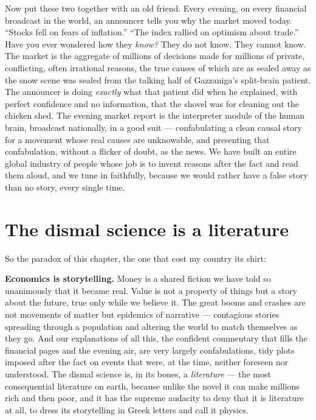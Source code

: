 Now put these two together with an old friend. Every evening, on every financial broadcast in the world, an announcer tells you why the market moved today. ``Stocks fell on fears of inflation.'' ``The index rallied on optimism about trade.'' Have you ever wondered how they \emph{know?} They do not know. They cannot know. The market is the aggregate of millions of decisions made for millions of private, conflicting, often irrational reasons, the true causes of which are as sealed away as the snow scene was sealed from the talking half of Gazzaniga's split-brain patient. The announcer is doing \emph{exactly} what that patient did when he explained, with perfect confidence and no information, that the shovel was for cleaning out the chicken shed. The evening market report is the interpreter module of the human brain, broadcast nationally, in a good suit — confabulating a clean causal story for a movement whose real causes are unknowable, and presenting that confabulation, without a flicker of doubt, as the news. We have built an entire global industry of people whose job is to invent reasons after the fact and read them aloud, and we tune in faithfully, because we would rather have a false story than no story, every single time.

\section*{The dismal science is a literature}

So the paradox of this chapter, the one that cost my country its shirt:

\textbf{Economics is storytelling.} Money is a shared fiction we have told so unanimously that it became real. Value is not a property of things but a story about the future, true only while we believe it. The great booms and crashes are not movements of matter but epidemics of narrative — contagious stories spreading through a population and altering the world to match themselves as they go. And our explanations of all this, the confident commentary that fills the financial pages and the evening air, are very largely confabulations, tidy plots imposed after the fact on events that were, at the time, neither foreseen nor understood. The dismal science is, in its bones, a \emph{literature} — the most consequential literature on earth, because unlike the novel it can make millions rich and then poor, and it has the supreme audacity to deny that it is literature at all, to dress its storytelling in Greek letters and call it physics.

